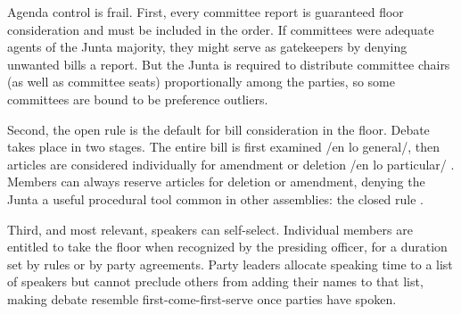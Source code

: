 \documentclass[letter,12pt]{article}
\begin{document}


Agenda control is frail. First, every committee report is guaranteed floor consideration and must be included in the order. If committees were adequate agents of the Junta majority, they might serve as gatekeepers by denying unwanted bills a report. But the Junta is required to distribute committee chairs (as well as committee seats) proportionally among the parties, so some committees are bound to be preference outliers.

Second, the open rule is the default for bill consideration in the floor. Debate takes place in two stages. The entire bill is first examined /en lo general/, then articles are considered individually for amendment or deletion /en lo particular/ \citep[see][]{heller.weldon.nd}. Members can always reserve articles for deletion or amendment, denying the Junta a useful procedural tool common in other assemblies: the closed rule \citep[eg.,][]{cox.2006,weingast.1992,magar-palanza-sin-Pdt-fast-track-chile-2021jop}.

Third, and most relevant, speakers can self-select. Individual members are entitled to take the floor when recognized by the presiding officer, for a duration set by rules or by party agreements. Party leaders allocate speaking time to a list of speakers but cannot preclude others from adding their names to that list, making debate resemble first-come-first-serve once parties have spoken. 

\end{document}
